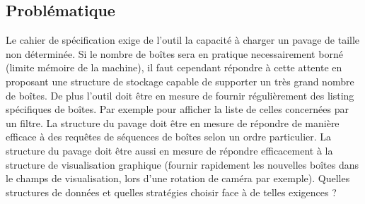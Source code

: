 \subsection{Problématique}
Le cahier de spécification exige de l'outil la capacité à charger un pavage de taille non déterminée. Si le nombre de boîtes sera en pratique necessairement borné (limite mémoire de la machine), il faut cependant répondre à cette attente en proposant une structure de stockage capable de supporter un très grand nombre de boîtes. De plus l'outil doit être en mesure de fournir régulièrement des listing spécifiques de boîtes. Par exemple pour afficher la liste de celles concernées par un filtre. La structure du pavage doit être en mesure de répondre de manière efficace à des requêtes de séquences de boîtes selon un ordre particulier. La structure du pavage doit être aussi en mesure de répondre efficacement à la structure  de visualisation graphique (fournir rapidement les nouvelles boîtes dans le champs de visualisation, lors d'une rotation de caméra par exemple). Quelles structures de données et quelles stratégies choisir face à de telles exigences ?  %







